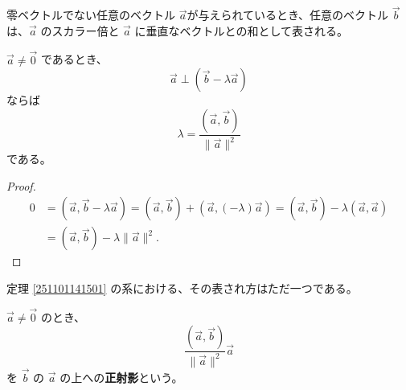 \begin{col*}
  零ベクトルでない任意のベクトル \(\vec{a}\)が与えられているとき、任意のベクトル \(\vec{b}\) は、\(\vec{a}\) のスカラー倍と \(\vec{a}\) に垂直なベクトルとの和として表される。
\end{col*}

\begin{thm}
  \(\vec{a}\neq\vec{0}\) であるとき、
  \[\vec{a}\perp(\vec{b}-\lambda\vec{a})\]
  ならば
  \[\lambda=\frac{(\vec{a},\vec{b})}{\|\vec{a}\|^2}\]
  である。
\end{thm}

\begin{proof}
  \begin{align*}
    0 &= (\vec{a},\vec{b}-\lambda\vec{a})=(\vec{a},\vec{b})+(\vec{a},(-\lambda)\vec{a})=(\vec{a},\vec{b})-\lambda(\vec{a},\vec{a}) \\
      &= (\vec{a},\vec{b})-\lambda\|\vec{a}\|^2.
  \end{align*}
\end{proof}

\begin{col*}
  定理 \ref{251101141501} の系における、その表され方はただ一つである。
\end{col*}

\begin{dfn}
  \(\vec{a}\neq\vec{0}\) のとき、
  \[\frac{(\vec{a},\vec{b})}{\|\vec{a}\|^2}\vec{a}\]
  を \(\vec{b}\) の \(\vec{a}\) の上への\textbf{正射影}という。
\end{dfn}
